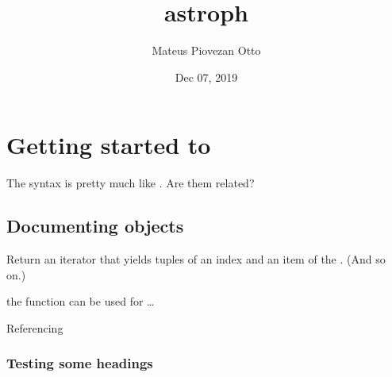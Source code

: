 \documentclass[letterpaper,10pt,english]{sphinxmanual}
\title{astroph}
\date{Dec 07, 2019}
\author{Mateus Piovezan Otto}
\begin{document}
\pagestyle{empty}
\sphinxmaketitle
\pagestyle{plain}
\sphinxtableofcontents
\pagestyle{normal}
\label{\detokenize{index::doc}}



\chapter{Getting started to }
\label{\detokenize{usage/installation:getting-started-to-sphinx}}\label{\detokenize{usage/installation::doc}}
The syntax is pretty much like . Are them related?


\section{Documenting objects}
\label{\detokenize{usage/installation:documenting-objects}}

\begin{fulllineitems}
\label{\detokenize{usage/installation:enumerate}}
Return an iterator that yields tuples of an index and an item of the
. (And so on.)

\end{fulllineitems}


the {\hyperref[\detokenize{usage/installation:enumerate}]{}} function can be used for …

Referencing 


\subsection{Testing some headings}
\label{\detokenize{usage/installation:testing-some-headings}}
\end{document}
